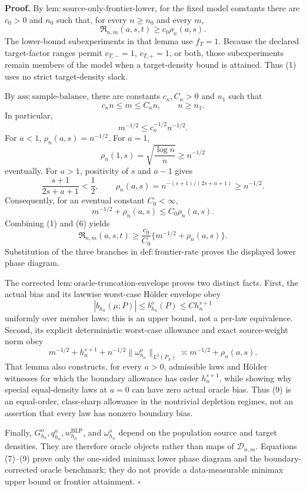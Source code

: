 \textbf{Proof.}
By \(\mathrm{lem:source\text{-}only\text{-}frontier\text{-}lower}\), for the fixed model constants there are \(c_0>0\) and \(n_0\) such that, for every \(n\ge n_0\) and every \(m\),
\[
\mathfrak R_{n,m}(a,s,t)\ge c_0\rho_n(a,s).
\tag{1}
\]
The lower-bound subexperiments in that lemma use \(f_T=1\). Because the declared target-factor ranges permit \(c_{T,-}=1\), \(c_{T,+}=1\), or both, those subexperiments remain members of the model when a target-density bound is attained. Thus (1) uses no strict target-density slack.

By \(\mathrm{ass:sample\text{-}balance}\), there are constants \(c_\kappa,C_\kappa>0\) and \(n_1\) such that
\[
c_\kappa n\le m\le C_\kappa n,
\qquad n\ge n_1.
\tag{2}
\]
In particular,
\[
m^{-1/2}\le c_\kappa^{-1/2}n^{-1/2}.
\tag{3}
\]
For \(a<1\), \(\rho_n(a,s)=n^{-1/2}\). For \(a=1\),
\[
\rho_n(1,s)=\sqrt{\frac{\log n}{n}}\ge n^{-1/2}
\tag{4}
\]
eventually. For \(a>1\), positivity of \(s\) and \(a-1\) gives
\[
\frac{s+1}{2s+a+1}<\frac12,
\qquad
\rho_n(a,s)=n^{-(s+1)/(2s+a+1)}\ge n^{-1/2}.
\tag{5}
\]
Consequently, for an eventual constant \(C_0<\infty\),
\[
m^{-1/2}+\rho_n(a,s)\le C_0\rho_n(a,s).
\tag{6}
\]
Combining (1) and (6) yields
\[
\mathfrak R_{n,m}(a,s,t)
\ge \frac{c_0}{C_0}\{m^{-1/2}+\rho_n(a,s)\}.
\tag{7}
\]
Substitution of the three branches in \(\mathrm{def:frontier\text{-}rate}\) proves the displayed lower phase diagram.

The corrected \(\mathrm{lem:oracle\text{-}truncation\text{-}envelope}\) proves two distinct facts. First, the actual bias and its lawwise worst-case H\"older envelope obey
\[
|b_{h_n}(\mu;P)|\le b_{h_n}^o(P)\le C h_n^{s+1}
\tag{8}
\]
uniformly over member laws; this is an upper bound, not a per-law equivalence. Second, its explicit deterministic worst-case allowance and exact source-weight norm obey
\[
m^{-1/2}+h_n^{s+1}
+n^{-1/2}\|\omega_{h_n}^o\|_{L^2(P_S)}
\asymp m^{-1/2}+\rho_n(a,s).
\tag{9}
\]
That lemma also constructs, for every \(a>0\), admissible laws and H\"older witnesses for which the boundary allowance has order \(h_n^{s+1}\), while showing why special equal-density laws at \(a=0\) can have zero actual oracle bias. Thus (9) is an equal-order, class-sharp allowance in the nontrivial depletion regimes, not an assertion that every law has nonzero boundary bias.

Finally, \(G_{h_n}^o,q_{h_n}^o,w_{h_n}^{\mathrm{BLP}}\), and \(\omega_{h_n}^o\) depend on the population source and target densities. They are therefore oracle objects rather than maps of \(\mathcal D_{n,m}\). Equations (7)--(9) prove only the one-sided minimax lower phase diagram and the boundary-corrected oracle benchmark; they do not provide a data-measurable minimax upper bound or frontier attainment. \(\square\)